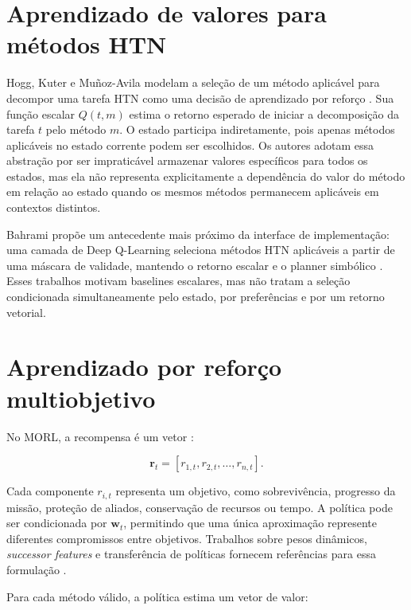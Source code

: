 \section{Aprendizado de valores para métodos HTN}

Hogg, Kuter e Muñoz-Avila modelam a seleção de um método aplicável para
decompor uma tarefa HTN como uma decisão de aprendizado por reforço
\cite{hogg2010}.
Sua função escalar $Q(t,m)$ estima o retorno esperado de iniciar a
decomposição da tarefa $t$ pelo método $m$.
O estado participa indiretamente, pois apenas métodos aplicáveis no estado
corrente podem ser escolhidos.
Os autores adotam essa abstração por ser impraticável armazenar valores
específicos para todos os estados, mas ela não representa explicitamente a
dependência do valor do método em relação ao estado quando os mesmos métodos
permanecem aplicáveis em contextos distintos.

Bahrami propõe um antecedente mais próximo da interface de implementação:
uma camada de Deep Q-Learning seleciona métodos HTN aplicáveis a partir de
uma máscara de validade, mantendo o retorno escalar e o planner simbólico
\cite{bahrami2025}.
Esses trabalhos motivam baselines escalares, mas não tratam a seleção
condicionada simultaneamente pelo estado, por preferências e por um retorno
vetorial.

\section{Aprendizado por reforço multiobjetivo}

No MORL, a recompensa é um vetor
\cite{roijers2013,hayes2022morl}:

\begin{equation}
\mathbf{r}_t =
\left[r_{1,t},r_{2,t},\dots,r_{n,t}\right].
\end{equation}

Cada componente $r_{i,t}$ representa um objetivo, como sobrevivência,
progresso da missão, proteção de aliados, conservação de recursos ou tempo.
A política pode ser condicionada por $\mathbf{w}_t$, permitindo que uma única
aproximação represente diferentes compromissos entre objetivos.
Trabalhos sobre pesos dinâmicos, \textit{successor features} e transferência de
políticas fornecem referências para essa formulação
\cite{abels2019,barreto2017successor,borsa2019usfa,barreto2020fast,alegre2022ols,alegre2026gpi}.

Para cada método válido, a política estima um vetor de valor:

